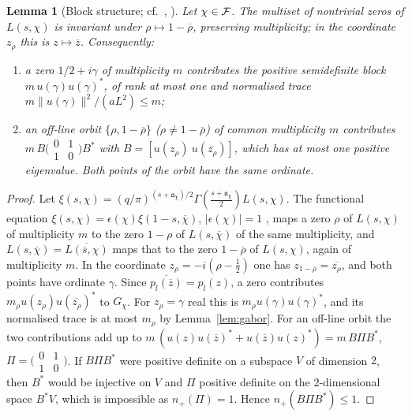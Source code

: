 \documentclass[11pt]{amsart}
\newtheorem{lemma}[theorem]{Lemma}
\theoremstyle{definition}
\theoremstyle{remark}
\numberwithin{equation}{section}
\begin{document}
\begin{lemma}[Block structure; cf.\ {\cite[\S8]{HY26}, \cite[Lemma~3.1, Prop.~4.1]{AF26}}]\label{lem:blocks}
Let $\chi\in\mathcal F$. The multiset of nontrivial zeros of $L(s,\chi)$ is invariant under $\rho\mapsto1-\overline\rho$, preserving multiplicity; in the coordinate $z_\rho$ this is $z\mapsto\overline z$. Consequently:
\begin{enumerate}[label=(\alph*)]
\item a zero $1/2+i\gamma$ of multiplicity $m$ contributes the positive semidefinite block $m\,u(\gamma)u(\gamma)^*$, of rank at most one and normalised trace $m\|u(\gamma)\|^2/(aL^2)\le m$;
\item an off-line orbit $\{\rho,1-\overline\rho\}$ ($\rho\ne1-\overline\rho$) of common multiplicity $m$ contributes $m\,B\big(\begin{smallmatrix}0&1\\1&0\end{smallmatrix}\big)B^*$ with $B=[u(z_\rho)\ u(\overline{z_\rho})]$, which has at most one positive eigenvalue. Both points of the orbit have the same ordinate.
\end{enumerate}
\end{lemma}
\begin{proof}
Let $\xi(s,\chi)=(q/\pi)^{(s+\mathfrak a_\chi)/2}\Gamma(\frac{s+\mathfrak a_\chi}2)L(s,\chi)$. The functional equation $\xi(s,\chi)=\epsilon(\chi)\xi(1-s,\overline\chi)$, $|\epsilon(\chi)|=1$ \cite[Ch.~9]{Dav}, maps a zero $\rho$ of $L(s,\chi)$ of multiplicity $m$ to the zero $1-\rho$ of $L(s,\overline\chi)$ of the same multiplicity, and $L(s,\overline\chi)=\overline{L(\overline s,\chi)}$ maps that to the zero $1-\overline\rho$ of $L(s,\chi)$, again of multiplicity $m$. In the coordinate $z_\rho=-i(\rho-\frac12)$ one has $z_{1-\overline\rho}=\overline{z_\rho}$, and both points have ordinate $\gamma$. Since $\overline{p_l(\overline z)}=p_l(z)$, a zero contributes $m_\rho u(z_\rho)u(\overline{z_\rho})^*$ to $G_\chi$. For $z_\rho=\gamma$ real this is $m_\rho u(\gamma)u(\gamma)^*$, and its normalised trace is at most $m_\rho$ by Lemma~\ref{lem:gabor}. For an off-line orbit the two contributions add up to $m\,(u(z)u(\overline z)^*+u(\overline z)u(z)^*)=m\,B\Pi B^*$, $\Pi=\big(\begin{smallmatrix}0&1\\1&0\end{smallmatrix}\big)$. If $B\Pi B^*$ were positive definite on a subspace $V$ of dimension $2$, then $B^*$ would be injective on $V$ and $\Pi$ positive definite on the $2$-dimensional space $B^*V$, which is impossible as $n_+(\Pi)=1$. Hence $n_+(B\Pi B^*)\le1$.
\end{proof}
\end{document}
